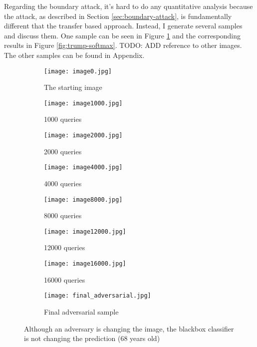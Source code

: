 Regarding the boundary attack, it's hard to do any quantitative analysis because the attack, as described in Section \ref{sec:boundary-attack}, is fundamentally different that the transfer based approach. Instead, I generate several samples and discuss them. One sample can be seen in Figure \ref{fig:trump-adv} and the corresponding results in Figure \ref{fig:trump-softmax}. TODO: ADD reference to other images. The other samples can be found in Appendix. 
\begin{figure}
\begin{subfigure}{.5\textwidth}
  \centering%
  \texttt{[image: image0.jpg]}
  \caption{The starting image}
\end{subfigure}
\begin{subfigure}{.5\textwidth}
  \centering
  \texttt{[image: image1000.jpg]}
  \caption{1000 queries}
\end{subfigure}

\begin{subfigure}{.5\textwidth}
  \centering
  \texttt{[image: image2000.jpg]}
  \caption{2000 queries}
\end{subfigure}
\begin{subfigure}{.5\textwidth}
  \centering
  \texttt{[image: image4000.jpg]}
  \caption{4000 queries}
\end{subfigure}

\begin{subfigure}{.5\textwidth}
  \centering
  \texttt{[image: image8000.jpg]}
  \caption{8000 queries}
\end{subfigure}
\begin{subfigure}{.5\textwidth}
  \centering
  \texttt{[image: image12000.jpg]}
  \caption{12000 queries}
\end{subfigure}

\begin{subfigure}{.5\textwidth}
  \centering
  \texttt{[image: image16000.jpg]}
  \caption{16000 queries}
\end{subfigure}
\begin{subfigure}{.5\textwidth}
  \centering
  \texttt{[image: final\_adversarial.jpg]}
  \caption{Final adversarial sample}
\end{subfigure}
\caption{Although an adversary is changing the image, the blackbox classifier is not changing the prediction (68 years old)}
\label{fig:trump-adv}
\end{figure}

